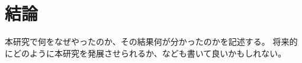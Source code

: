 \chapter{結論}\label{ch:conclusion}

本研究で何をなぜやったのか、その結果何が分かったのかを記述する。
将来的にどのように本研究を発展させられるか、なども書いて良いかもしれない。